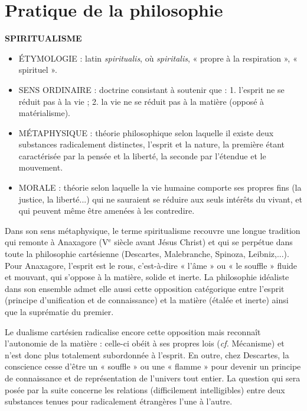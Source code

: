 
\section{Pratique de la philosophie}
{\bf S{\footnotesize PIRITUALISME}}

\begin{itemize}[leftmargin=1cm, label=, itemsep=1pt]
\item {\footnotesize ÉTYMOLOGIE} : latin {\it spiritualis}, où
{\it spiritalis}, « propre à la respiration »,
« spirituel ».
\item {\footnotesize SENS ORDINAIRE} : doctrine consistant à soutenir que : 1.
l'esprit ne se réduit pas à la vie ; 2.
la vie ne se réduit pas à la matière
(opposé à matérialisme).
\item {\footnotesize MÉTAPHYSIQUE} : théorie philosophique
selon laquelle il existe deux substances radicalement distinctes, l’esprit et la nature, la première étant
caractérisée par la pensée et la
liberté, la seconde par l'étendue et
le mouvement.
\item {\footnotesize MORALE} : théorie
selon laquelle la vie humaine
comporte ses propres fins (la justice, la liberté...) qui ne sauraient se
réduire aux seuls intérêts du vivant,
et qui peuvent même être amenées
à les contredire.
\end{itemize}


 

Dans son sens métaphysique, le terme
spiritualisme recouvre une longue tradition qui remonte à Anaxagore ({\footnotesize V}$^\text{e}$ siècle avant Jésus Christ) et qui se perpétue dans toute la
philosophie  cartésienne  (Descartes,
Malebranche, Spinoza, Leibniz,...). Pour
Anaxagore, l'esprit est le rous, c'est-à-dire
« l'âme » ou « le souffle » fluide et mouvant, qui s'oppose à la matière, solide et
inerte. La philosophie idéaliste dans son
ensemble admet elle aussi cette opposition catégorique entre l'esprit (principe
d'unification et de connaissance) et la
matière (étalée et inerte) ainsi que la
suprématie du premier.

Le dualisme cartésien radicalise encore
cette opposition mais reconnaît l’autonomie de la matière : celle-ci obéit à ses
propres lois ({\it cf.} Mécanisme) et n'est
donc plus totalement subordonnée à
l'esprit. En outre, chez Descartes, la
conscience cesse d’être un « souffle » ou
une « flamme » pour devenir un principe
de connaissance et de représentation de
l'univers tout entier. La question qui sera
posée par la suite concerne les relations
(difficilement intelligibles) entre deux
substances tenues pour radicalement
étrangères l’une à l’autre.

